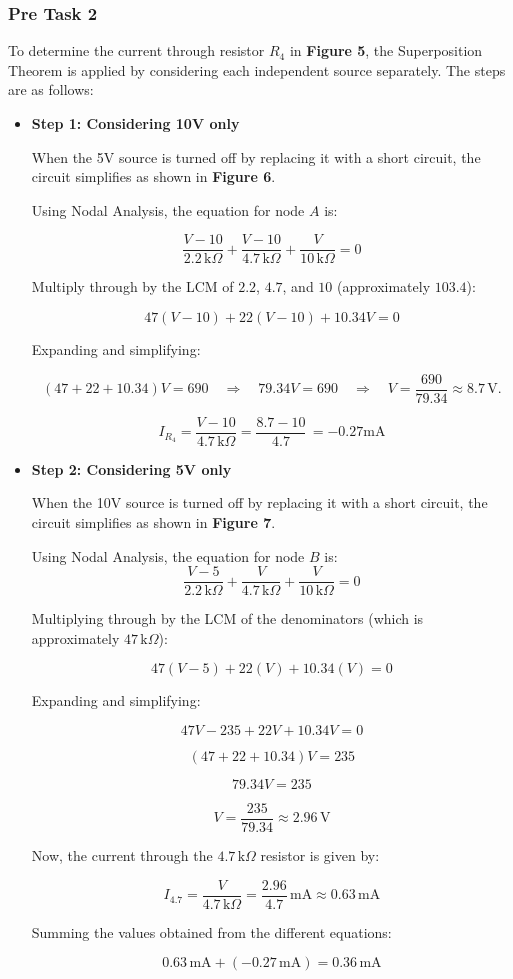 \documentclass{article}
\begin{document}
\newpage

\subsubsection{Pre Task 2}


To determine the current through resistor \( R_4 \) in \textbf{Figure 5}, the Superposition Theorem is applied by considering each independent source separately. The steps are as follows:
\begin{itemize}
  \item \textbf{Step 1: Considering 10V only}
  
  When the 5V source is turned off by replacing it with a short circuit, the circuit simplifies as shown in \textbf{Figure 6}.

  Using Nodal Analysis, the equation for node \(A\) is:

  \[
  \frac{V - 10}{2.2 \, \text{k}\Omega} + \frac{V - 10}{4.7 \, \text{k}\Omega} + \frac{V}{10 \, \text{k}\Omega} = 0
  \]
  
  Multiply through by the LCM of \(2.2\), \(4.7\), and \(10\) (approximately \(103.4\)):
  
  \[
  47(V - 10) + 22(V - 10) + 10.34V = 0
  \]
  
  Expanding and simplifying:
  
  \[
  (47 + 22 + 10.34)V = 690 \quad \Rightarrow \quad 79.34V = 690 \quad \Rightarrow \quad V = \frac{690}{79.34} \approx 8.7 \, \text{V}.
  \]

  \[
  I_{R_4} = \frac{V - 10}{4.7 \, \text{k}\Omega} = \frac{8.7 - 10}{4.7} \, = -0.27 \text{mA}
  \]

\item \textbf{Step 2: Considering 5V only}

When the 10V source is turned off by replacing it with a short circuit, the circuit simplifies as shown in \textbf{Figure 7}.

Using Nodal Analysis, the equation for node \(B\) is:
\[
\frac{V - 5}{2.2 \, \text{k}\Omega} + \frac{V}{4.7 \, \text{k}\Omega} + \frac{V}{10 \, \text{k}\Omega} = 0
\]

Multiplying through by the LCM of the denominators (which is approximately \(47 \, \text{k}\Omega\)):

\[
47(V - 5) + 22(V) + 10.34(V) = 0
\]

Expanding and simplifying:

\[
47V - 235 + 22V + 10.34V = 0
\]

\[
(47 + 22 + 10.34)V = 235
\]

\[
79.34V = 235
\]

\[
V = \frac{235}{79.34} \approx 2.96 \, \text{V}
\]

Now, the current through the \(4.7 \, \text{k}\Omega\) resistor is given by:

\[
I_{4.7} = \frac{V}{4.7 \, \text{k}\Omega} = \frac{2.96}{4.7} \, \text{mA} \approx 0.63 \, \text{mA}
\]


Summing the values obtained from the different equations:

\[
0.63 \, \text{mA} + (-0.27 \, \text{mA}) = 0.36 \, \text{mA}
\]

\end{itemize}
\end{document}
